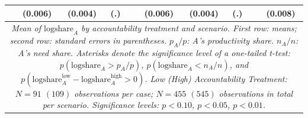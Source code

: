 \documentclass[smallcondensed]{svjour3}
\begin{document}
\begin{table}
{\begin{tabularx}{13.5cm}{cccccccccc}
          & (0.006)        & (0.004)        &  (.)              &   & (0.006)        & (0.004)         & (.)             &   & (0.008)           \\\hline
\multicolumn{10}{p{13cm}}{\footnotesize\textit{Mean of $\mbox{logshare}_A$ by accountability treatment and scenario. First row: means; second row: standard errors in parentheses.  $p_A/p$: A's productivity share. $n_A/n$: A's need share. Asterisks denote the significance level of a one-tailed t-test: $p(\mbox{logshare}_A>p_A/p)$, $p(\mbox{logshare}_A<n_A/n)$, and $p(\mbox{logshare}_A^{\mbox{low}}-\mbox{logshare}_A^{\mbox{high}}>0)$. Low (High) Accountability Treatment: $N=91$ $(109)$ observations per case; $N=455$ $(545)$ observations in total per scenario. Significance levels: \sym{*} \(p<0.10\), \sym{**} \(p<0.05\), \sym{***} \(p<0.01\).}}
\end{tabularx}
}
\end{table}
%
\clearpage
%
\end{document}

